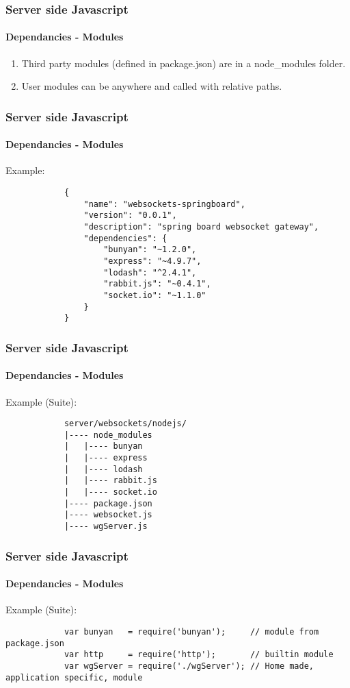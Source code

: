\documentclass{beamer}
\begin{document}
	\begin{frame}
		\frametitle{Server side Javascript}
		\framesubtitle{Dependancies - Modules}

		\begin{enumerate}
			\item Third party modules (defined in package.json) are in a
				node\_modules folder.
			\item User modules can be anywhere and called with relative paths.
		\end{enumerate}
	\end{frame}

	\begin{frame}[fragile]
		\frametitle{Server side Javascript}
		\framesubtitle{Dependancies - Modules}

		Example:
		\begin{verbatim}
			{
			    "name": "websockets-springboard",
			    "version": "0.0.1",
			    "description": "spring board websocket gateway",
			    "dependencies": {
			        "bunyan": "~1.2.0",
			        "express": "~4.9.7",
			        "lodash": "^2.4.1",
			        "rabbit.js": "~0.4.1",
			        "socket.io": "~1.1.0"
			    }
			}
		\end{verbatim}
	\end{frame}

	\begin{frame}[fragile]
		\frametitle{Server side Javascript}
		\framesubtitle{Dependancies - Modules}

		Example (Suite):
		\begin{verbatim}
			server/websockets/nodejs/
			|---- node_modules
			|   |---- bunyan
			|   |---- express
			|   |---- lodash
			|   |---- rabbit.js
			|   |---- socket.io
			|---- package.json
			|---- websocket.js
			|---- wgServer.js
		\end{verbatim}
	\end{frame}

	\begin{frame}[fragile]
		\frametitle{Server side Javascript}
		\framesubtitle{Dependancies - Modules}

		Example (Suite):
		\begin{verbatim}
			var bunyan   = require('bunyan');     // module from package.json
			var http     = require('http');       // builtin module
			var wgServer = require('./wgServer'); // Home made, application specific, module
		\end{verbatim}
	\end{frame}
\end{document}
